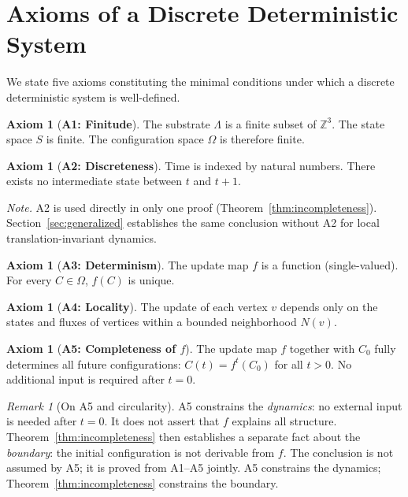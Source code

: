 \documentclass[12pt]{article}
\theoremstyle{plain}
\theoremstyle{definition}
\newtheorem{axiomenv}[theorem]{Axiom}
\theoremstyle{remark}
\newtheorem{remark}[theorem]{Remark}
\newcommand{\Lattice}{\Lambda}
\newcommand{\Integer}{\mathbb{Z}}
\begin{document}
\section{Axioms of a Discrete Deterministic System}

We state five axioms constituting the minimal conditions under which a discrete deterministic system is well-defined.

\begin{axiomenv}[\textbf{A1: Finitude}]
The substrate $\Lattice$ is a finite subset of $\Integer^3$. The state space $S$ is finite. The configuration space $\Omega$ is therefore finite.
\end{axiomenv}

\begin{axiomenv}[\textbf{A2: Discreteness}]
Time is indexed by natural numbers. There exists no intermediate state between $t$ and $t+1$.
\end{axiomenv}

\noindent\textit{Note.} A2 is used directly in only one proof (Theorem~\ref{thm:incompleteness}). Section~\ref{sec:generalized} establishes the same conclusion without A2 for local translation-invariant dynamics.

\begin{axiomenv}[\textbf{A3: Determinism}]
The update map $f$ is a function (single-valued). For every $C \in \Omega$, $f(C)$ is unique.
\end{axiomenv}

\begin{axiomenv}[\textbf{A4: Locality}]
The update of each vertex $v$ depends only on the states and fluxes of vertices within a bounded neighborhood $N(v)$.
\end{axiomenv}

\begin{axiomenv}[\textbf{A5: Completeness of $f$}]
The update map $f$ together with $C_0$ fully determines all future configurations: $C(t) = f^t(C_0)$ for all $t > 0$. No additional input is required after $t = 0$.
\end{axiomenv}

\begin{remark}[On A5 and circularity]\label{rem:a5}
A5 constrains the \emph{dynamics}: no external input is needed after $t = 0$. It does not assert that $f$ explains all structure. Theorem~\ref{thm:incompleteness} then establishes a separate fact about the \emph{boundary}: the initial configuration is not derivable from $f$. The conclusion is not assumed by A5; it is proved from A1--A5 jointly. A5 constrains the dynamics; Theorem~\ref{thm:incompleteness} constrains the boundary.
\end{remark}
\end{document}
